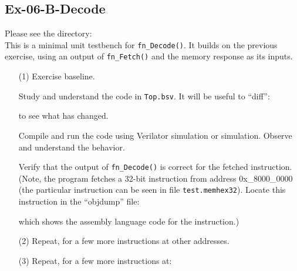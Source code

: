 
\subsection*{Ex-06-B-Decode}
\label{Ex-06-B-Decode}

Please see the directory:  \\
This is a minimal unit testbench for \verb|fn_Decode()|.  It builds on
the previous exercise, using an output of \verb|fn_Fetch()| and the
memory response as its inputs.

\begin{itemize}

\item[(1)] Exercise baseline.

    Study and understand the code in \verb|Top.bsv|.  It will be
    useful to ``diff'':
    to see what has changed.

    Compile and run the code using Verilator simulation or {\BLUESIM}
    simulation.  Observe and understand the behavior.

    Verify that the output of \verb|fn_Decode()| is correct for the
    fetched instruction.  (Note, the program fetches a 32-bit
    instruction from address 0x\_8000\_0000 (the particular
    instruction can be seen in file \verb|test.memhex32|).  Locate
    this instruction in the ``objdump'' file:


    which shows the assembly language code for the instruction.)

\item[(2)] Repeat, for a few more instructions at other addresses.

\item[(3)] Repeat, for a few more instructions at:


\end{itemize}
